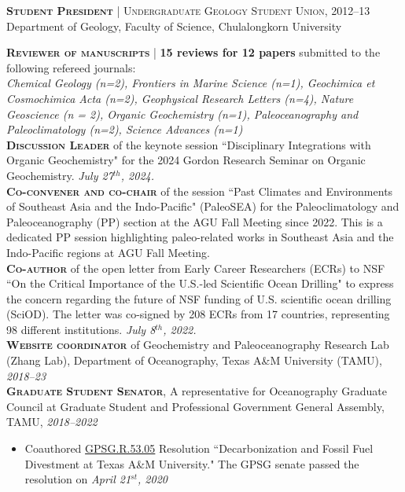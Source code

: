 \documentclass[10pt, letter]{article}
\newcommand{\margintext}[1]{\marginnote{\normalsize\textbf #1 |}}
\begin{document}
\bigskip
\textsc{\textbf{Student President}} | \textsc{Undergraduate Geology Student Union}, 2012–13 \\
Department of Geology, Faculty of Science, Chulalongkorn University

\bigskip
\margintext{Services}
\textsc{\textbf{Reviewer of manuscripts}} | \textbf{15 reviews for 12 papers} submitted to the following refereed journals: \\
\textit{Chemical Geology (n=2), Frontiers in Marine Science (n=1), Geochimica et Cosmochimica Acta (n=2), Geophysical Research Letters (n=4), Nature Geoscience (n = 2), Organic Geochemistry (n=1), Paleoceanography and Paleoclimatology (n=2), Science Advances (n=1)} \\

\textsc{\textbf{Discussion Leader}} of the keynote session ``Disciplinary Integrations with Organic Geochemistry" for the 2024 Gordon Research Seminar on Organic Geochemistry. \textit{July 27$^{th}$, 2024.} \\

\textsc{\textbf{Co-convener and co-chair}} of the session ``Past Climates and Environments of Southeast Asia and the Indo-Pacific" (PaleoSEA) for the Paleoclimatology and Paleoceanography (PP) section at the AGU Fall Meeting since 2022. This is a dedicated PP session highlighting paleo-related works in Southeast Asia and the Indo-Pacific regions at AGU Fall Meeting. \\

\textsc{\textbf{Co-author}} of the open letter from Early Career Researchers (ECRs) to NSF ``On the Critical Importance of the U.S.-led Scientific Ocean Drilling" to express the concern regarding the future of NSF funding of U.S. scientific ocean drilling (SciOD). The letter was co-signed by 208 ECRs from 17 countries, representing 98 different institutions. \textit{July 8$^{th}$, 2022.} \\

\textsc{\textbf{Website coordinator}} of Geochemistry and Paleoceanography Research Lab (Zhang Lab), Department of Oceanography, Texas A\&M University (TAMU), \textit{2018–23} \\

\textsc{\textbf{Graduate Student Senator}}, A representative for Oceanography Graduate Council at Graduate Student and Professional Government General Assembly, TAMU, \textit{2018–2022} \\
\begin{itemize}[noitemsep,nolistsep,leftmargin=*]
    \item Coauthored \href{https://gpsg.tamu.edu/resolutions-and-bills/}{GPSG.R.53.05} Resolution ``Decarbonization and Fossil Fuel Divestment at Texas A\&M University." The GPSG senate passed the resolution on \textit{April 21$^{st}$, 2020}
\end{itemize}
\end{document}
